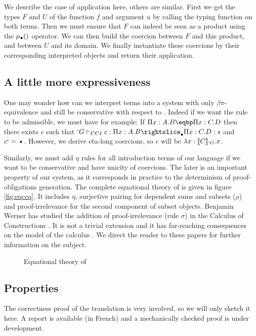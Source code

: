 \documentclass{llncs}
\begin{document}
We describe the case of application here, others are similar. First we
get the \Russell types $F$ and $U$ of the function $f$ and argument $u$ by calling the
typing function on both terms. Then we must ensure that $F$ can indeed
be seen as a product using the $\mualgo$ operator. We can then build
the coercion between $F$ and this product, and between $U$ and its
domain. We finally instantiate these coercions by their corresponding
interpreted objects and return their application.

\subsection{A little more expressiveness}
One may wonder how can we interpret \Russell terms into a system with only
$\beta\pi$-equivalence and still be conservative with respect to \CIC. 
Indeed if we want the  rule to be admissible, we must have for example:
If $\Pi x : A.B \eqbp \Pi x : C.D$ then there exists $c$ such that
$\subimpl{`G}{c}{\Pi x : A.B}{\Pi x : C.D}{s}$ and $c `= \ctxdot$.
However, we derive eta-long coercions, so $c$ will be $\lambda x :
\llbracket C \rrbracket_{`G}.x$. 

Similarly, we must add $\eta$ rules for all introduction terms of our
language if we want to be conservative and have unicity of
coercions. The later is an important property of our system, as it
corresponds in practice to the determinism of proof-obligations
generation. The complete equational theory of \CICq{} is given in figure
\vref{fig:eqccq}. It includes $\eta$, surjective pairing for dependent
sums and subsets ($\rho$) and proof-irrelevance for the second component
of subset objects.
Benjamin Werner has studied the addition of proof-irrelevance (rule
$\sigma$) in the Calculus of Constructions
\cite{Werner:ProofIrrelevance}. It is not a trivial extension and it has
far-reaching consequences on the model of the calculus
\cite{DBLP:conf/types/MiquelW02}. We direct the reader to these papers for further
information on the subject.
\begin{figure}[ht]
  \vspace{-1em}
  \ccqeqarr
  \vspace{-2em}
  \caption{Equational theory of \CICq}
  \label{fig:eqccq}
  \vspace{-1em}
\end{figure}

\subsection{Properties}
The correctness proof of the translation is very involved, so we will
only sketch it here. A report \cite{sozeau:Coq/Russell/report} is
available (in French) and a mechanically checked proof is under development.
\end{document}
